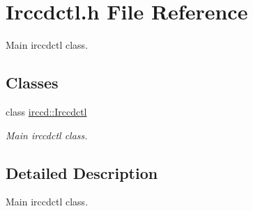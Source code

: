 \hypertarget{a00081}{\section{Irccdctl.\-h File Reference}
\label{a00081}
}


Main irccdctl class.  


\subsection*{Classes}
\begin{DoxyCompactItemize}
\item 
class \hyperlink{a00033}{irccd\-::\-Irccdctl}
\begin{DoxyCompactList}\small\item\em Main irccdctl class. \end{DoxyCompactList}\end{DoxyCompactItemize}


\subsection{Detailed Description}
Main irccdctl class. 